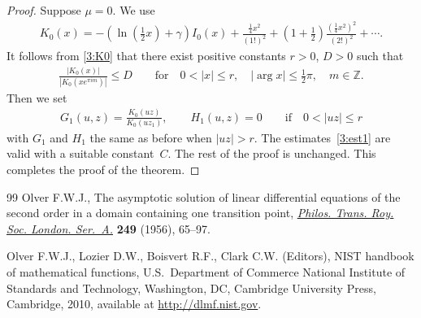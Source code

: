 \documentclass[11pt]{article}
\numberwithin{equation}{section}
\begin{document}
\begin{proof}
Suppose $\mu=0$.
We use \cite[(10.31.2)]{NIST}
\begin{gather}\label{3:K0}
K_0(x)=-\left(\ln\left(\frac12x\right)+\gamma\right)I_0(x)+\frac{\frac14x^2}{(1!)^2}+\left(1+\frac12\right)
\frac{\left(\frac14x^2\right)^2}{\left(2!\right)^2}+\cdots.
\end{gather}
It follows from \eqref{3:K0} that there exist positive constants $r>0$, $D>0$ such that
\begin{gather*}%
\frac{|K_0(x)|}{|K_0(xe^{\pi i m})|}\le D \qquad\text{for} \quad 0<|x|\le r, \quad |\arg x|\le\frac12\pi, \quad m\in\mathbb{Z}.
\end{gather*}
Then we set
\begin{gather*}
G_1(u,z)=\frac{K_0(uz)}{K_0(uz_1)},\qquad H_1(u,z)=0\qquad\text{if} \quad 0<|uz|\le r
\end{gather*}
with $G_1$ and $H_1$ the same as before when $|uz|>r$. The estimates~\eqref{3:est1} are valid with a suitable constant~$C$.
The rest of the proof is unchanged.
This completes the proof of the theorem.
\end{proof}
\begin{thebibliography}{99}
Olver F.W.J., The asymptotic solution of linear dif\/ferential equations of the
 second order in a domain containing one transition point, \href{http://dx.doi.org/10.1098/rsta.1956.0015}{\textit{Philos.
 Trans. Roy. Soc. London. Ser.~A.}} \textbf{249} (1956), 65--97.

Olver F.W.J., Lozier D.W., Boisvert R.F., Clark C.W. (Editors), N{IST} handbook
 of mathematical functions, U.S.~Department of Commerce National Institute of
 Standards and Technology, Washington, DC, Cambridge University Press,
 Cambridge, 2010, {a}vailable at \url{http://dlmf.nist.gov}.

\end{thebibliography}
\end{document}
